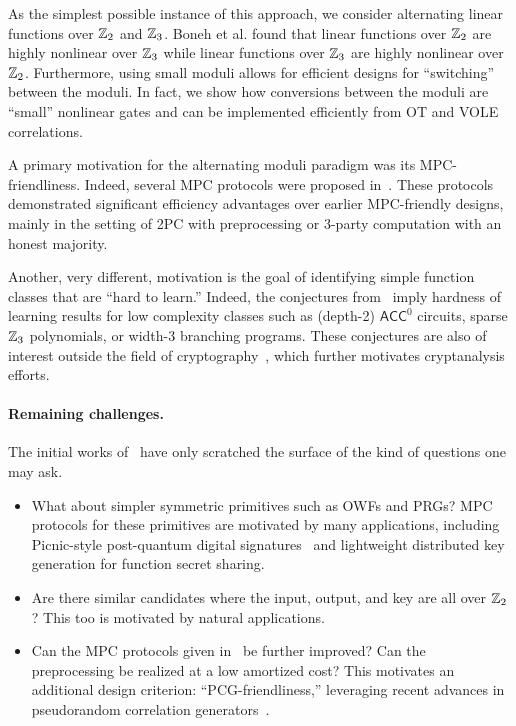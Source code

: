As the simplest possible instance of this approach, we consider alternating linear functions over $\mathbb{Z}_2$ and $\mathbb{Z}_3$. Boneh et al. found that linear functions over $\mathbb{Z}_2$ are highly nonlinear over $\mathbb{Z}_3$ while linear functions over $\mathbb{Z}_3$ are highly nonlinear over $\mathbb{Z}_2$. Furthermore, using small moduli allows for efficient designs for ``switching'' between the moduli. In fact, we show how conversions between the moduli are “small” nonlinear gates and can be implemented efficiently from OT and VOLE correlations.
\fi

A primary motivation for the alternating moduli paradigm was its MPC-friendliness. Indeed, several MPC protocols were proposed in~\cite{boneh2018-darkmatter}. These protocols demonstrated significant efficiency advantages over earlier MPC-friendly designs, mainly in the setting of 2PC with preprocessing or 3-party computation with an honest majority.

Another, very different, motivation is the goal of identifying simple function classes that are ``hard to learn.''  Indeed,  the conjectures from~\cite{boneh2018-darkmatter} imply hardness of learning results for low complexity classes such as (depth-2) $\mathsf{ACC}^0$ circuits, sparse $\mathbb{Z}_3$ polynomials, or width-3 branching programs. These conjectures are also of interest outside the field of cryptography~\cite{Chen19,FilmusIKK20,ChenR20,KabanetsKLMO20}, which further motivates cryptanalysis efforts.

\paragraph{Remaining challenges.} The initial works of~\cite{boneh2018-darkmatter,cheon2020-adventures} have only scratched the surface of the kind of questions one may ask.
\begin{itemize}
\item
What about simpler symmetric primitives such as OWFs and PRGs? MPC protocols for these primitives are motivated by many applications, including Picnic-style post-quantum digital signatures~\cite{chase2017-picnic,kales2020-picnic} and lightweight distributed key generation for function secret sharing.
\item Are there similar candidates where the input, output, and key are all over $\mathbb{Z}_2$? This too is motivated by natural applications.
\item Can the MPC protocols given in~\cite{boneh2018-darkmatter} be further improved? Can the preprocessing be realized at a low amortized cost? This motivates an additional design criterion: ``PCG-friendliness,'' leveraging recent advances in pseudorandom correlation generators~\cite{BCGI18,BCGIKRS19,yang2020-ferret}.
\end{itemize}

